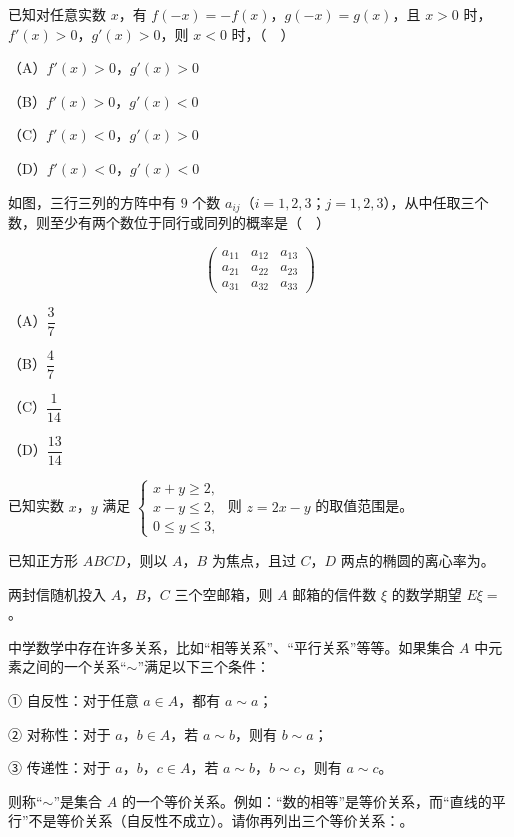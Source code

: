 \begin{question}
已知对任意实数 $x$，有 $f(-x)=-f(x)$，$g(-x)=g(x)$，且 $x>0$ 时，$f'(x)>0$，$g'(x)>0$，则 $x<0$ 时，（　）

（A）$f'(x)>0$，$g'(x)>0$

（B）$f'(x)>0$，$g'(x)<0$

（C）$f'(x)<0$，$g'(x)>0$

（D）$f'(x)<0$，$g'(x)<0$

\end{question}
\begin{question}
如图，三行三列的方阵中有 $9$ 个数 $a_{ij}$（$i=1,2,3$；$j=1,2,3$），从中任取三个数，则至少有两个数位于同行或同列的概率是（　）

\nopagebreak[4]
\[\begin{pmatrix}a_{11}&a_{12}&a_{13}\\ a_{21}&a_{22}&a_{23}\\ a_{31}&a_{32}&a_{33}\end{pmatrix}\]

（A）$\dfrac37$

（B）$\dfrac47$

（C）$\dfrac1{14}$

（D）$\dfrac{13}{14}$

\end{question}

\begin{question}
已知实数 $x$，$y$ 满足 $\begin{cases}x+y\geqslant2,\\ x-y\leqslant2,\\ 0\leqslant y\leqslant3,\end{cases}$ 则 $z=2x-y$ 的取值范围是\gkblank{}。

\end{question}
\begin{question}
已知正方形 $ABCD$，则以 $A$，$B$ 为焦点，且过 $C$，$D$ 两点的椭圆的离心率为\gkblank{}。

\end{question}
\begin{question}
两封信随机投入 $A$，$B$，$C$ 三个空邮箱，则 $A$ 邮箱的信件数 $\xi$ 的数学期望 $E\xi=$\gkblank{}。

\end{question}
\begin{question}
中学数学中存在许多关系，比如“相等关系”、“平行关系”等等。如果集合 $A$ 中元素之间的一个关系“$\sim$”满足以下三个条件：

① 自反性：对于任意 $a\in A$，都有 $a\sim a$；

② 对称性：对于 $a$，$b\in A$，若 $a\sim b$，则有 $b\sim a$；

③ 传递性：对于 $a$，$b$，$c\in A$，若 $a\sim b$，$b\sim c$，则有 $a\sim c$。

则称“$\sim$”是集合 $A$ 的一个等价关系。例如：“数的相等”是等价关系，而“直线的平行”不是等价关系（自反性不成立）。请你再列出三个等价关系：\gkblank{}。

\end{question}

